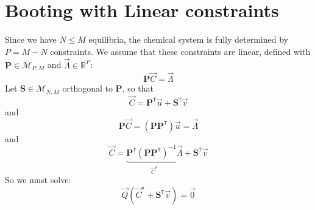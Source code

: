 \documentclass[aps,12pt]{revtex4}
\newcommand{\trn}[1]{{#1}^{\mathtt{T}}}
\begin{document}
\section{Booting  with Linear constraints}
Since we have $N\leq M$ equilibria, the chemical system is fully determined by
$P=M-N$ constraints.
We assume that these constraints are linear, defined with $\bm{P}\in\mathcal{M}_{P,M}$ and $\vec{\Lambda}\in\mathbb{R}^P$:
\begin{equation}
	\bm{P} \vec{C} = \vec{\Lambda}
\end{equation}
Let $\bm{S}\in\mathcal{M}_{N,M}$ orthogonal to $\bm{P}$, so that
\begin{equation}
	\vec{C} = \trn{\bm{P}} \vec{u} + \trn{\bm{S}} \vec{v}
\end{equation}
and
\begin{equation}
	\bm{P} \vec{C} = \left(\bm{P} \trn{\bm{P}}\right) \vec{u} = \vec{\Lambda}
\end{equation}
and
\begin{equation}
	\vec{C} = \underbrace{\trn{\bm{P}} \left(\bm{P} \trn{\bm{P}}\right)^{-1} \vec{\Lambda}}_{\vec{C}^\star} + \trn{\bm{S}} \vec{v}
\end{equation}
So we must solve:
\begin{equation}
	\vec{Q} \left( \vec{C}^\star + \trn{\bm{S}}\vec{v} \right) = \vec{0}
\end{equation}
\end{document}
